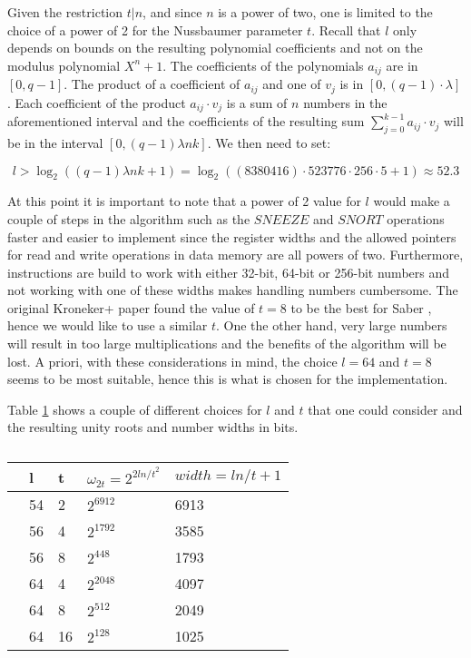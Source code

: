 Given the restriction $t|n$, and since $n$ is a power of two, one is limited to the choice of a power of 2 for the Nussbaumer parameter $t$. Recall that $l$ only depends on bounds on the resulting polynomial coefficients and not on the modulus polynomial $X^n + 1$. The coefficients of the polynomials $a_{ij}$ are in $[0, q - 1]$. The product of a coefficient of $a_{ij}$ and one of $v_j$ is in $[0, (q - 1) \cdot \lambda]$. Each coefficient of the product $a_{ij} \cdot v_j$ is a sum of $n$ numbers in the aforementioned interval and the coefficients of the resulting sum $\sum_{j=0}^{k-1} a_{ij} \cdot v_j$ will be in the interval $[0, (q - 1) \lambda n k]$. We then need to set:

\begin{equation*}
    l > \log_2((q - 1) \lambda n k + 1) = \log_2((8380416) \cdot 523776 \cdot 256 \cdot 5 + 1) \approx 52.3
\end{equation*}

At this point it is important to note that a power of 2 value for $l$ would make a couple of steps in the algorithm such as the $SNEEZE$ and $SNORT$ operations faster and easier to implement since the register widths and the allowed pointers for read and write operations in data memory are all powers of two. Furthermore, instructions are build to work with either 32-bit, 64-bit or 256-bit numbers and not working with one of these widths makes handling numbers cumbersome. The original Kroneker+ paper found the value of $t=8$ to be the best for Saber \parencite{10.1007/978-3-030-57808-4_21}, hence we would like to use a similar $t$. One the other hand, very large numbers will result in too large multiplications and the benefits of the algorithm will be lost. A priori, with these considerations in mind, the choice $l=64$ and $t=8$ seems to be most suitable, hence this is what is chosen for the implementation.

Table \ref{tab:parameter-choice} shows a couple of different choices for $l$ and $t$ that one could consider and the resulting unity roots and number widths in bits.


\begin{table}[htpb]
    \caption[]{}\label{tab:parameter-choice}
    \centering
    \begin{tabular}{l l l l l}
      \toprule
         & l & t & $\omega_{2t} = 2^{2ln/t^2}$ & $width = ln/t + 1$ \\
      \midrule
         & 54 & 2  & $2^{6912}$ & 6913 \\
         & 56 & 4  & $2^{1792}$ & 3585 \\
         & 56 & 8  & $2^{448}$ & 1793 \\
         & 64 & 4  & $2^{2048}$ & 4097 \\
         & 64 & 8  & $2^{512}$  & 2049 \\
         & 64 & 16 & $2^{128}$  & 1025 \\
      \bottomrule
    \end{tabular}
  \end{table}
  
